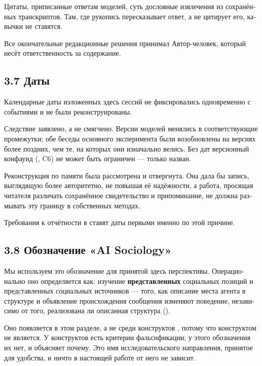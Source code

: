 \begin{russian}
Цитаты, приписанные ответам моделей, суть дословные извлечения из сохранённых транскриптов. Там, где рукопись пересказывает ответ, а не цитирует его, кавычки не ставятся.

Все окончательные редакционные решения принимал Автор-человек, который несёт ответственность за содержание.


\subsection*{3.7 Даты}
\label{sec:ru:3.7}

Календарные даты изложенных здесь сессий не фиксировались одновременно с событиями и не были реконструированы.

Следствие заявлено, а не смягчено. Версии моделей менялись в соответствующие промежутки; обе беседы основного эксперимента были возобновлены на версиях более поздних, чем те, на которых они изначально велись. Без дат версионный конфаунд (, C6) не может быть ограничен — только назван.

Реконструкция по памяти была рассмотрена и отвергнута. Она дала бы запись, выглядящую более авторитетно, не повышая её надёжности, а работа, просящая читателя различать сохранённое свидетельство и припоминание, не должна размывать эту границу в собственных методах.

Требования к отчётности в  ставят даты первыми именно по этой причине.


\subsection*{3.8 Обозначение «AI Sociology»}
\label{sec:ru:3.8}

Мы используем это обозначение для принятой здесь перспективы. Операционально оно определяется как: изучение \textbf{представленных} социальных позиций и представленных социальных источников — того, как описание места агента в структуре и объявление происхождения сообщения изменяют поведение, независимо от того, реализована ли описанная структура ().

Оно появляется в этом разделе, а не среди конструктов , потому что конструктом не является. У конструктов  есть критерии фальсификации; у этого обозначения их нет, и  объясняет почему. Это имя исследовательского направления, принятое для удобства, и ничто в настоящей работе от него не зависит.


\end{russian}
